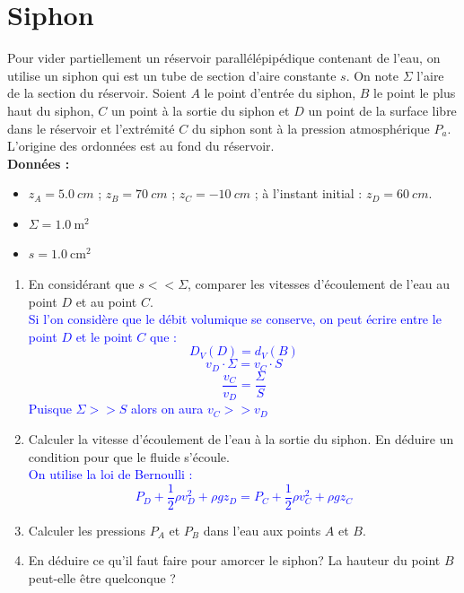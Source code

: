 \documentclass[a4paper,11pt,fleqn,usenames,dvipsnames]{article}%
\begin{document}
\section{Siphon}
Pour vider partiellement un réservoir parallélépipédique contenant de l'eau, on utilise un siphon qui est un tube de section d'aire constante $s$. On note $\Sigma$ l'aire de la section du réservoir. Soient $A$ le point d'entrée du siphon, $B$ le point le plus haut du siphon, $C$ un point à la sortie du siphon et $D$ un point de la surface libre dans le réservoir et l'extrémité $C$ du siphon sont à la pression atmosphérique $P_a$. L'origine des ordonnées est au fond du réservoir.\\
\textbf{Données :}
\begin{itemize}
	\item $z_A=\SI{5,0}{cm}$ ; $z_B=\SI{70}{cm}$ ; $z_C=\SI{-10}{cm}$ ; à l'instant initial : $z_D=\SI{60}{cm}$.
	\item $\Sigma= \SI{1,0}{\meter\squared}$
	\item $s=\SI{1,0}{\centi\meter\squared}$   
\end{itemize}
\begin{enumerate}
	\item En considérant que $s<<\Sigma$, comparer les vitesses d'écoulement de l'eau au point $D$ et au point $C$.\\
	\textcolor{blue}{Si l'on considère que le débit volumique se conserve, on peut écrire entre le point $D$ et le point $C$ que : $$D_V(D)=d_V(B)$$ $$v_D \cdot \Sigma = v_C \cdot S$$
	$$ \dfrac{v_C }{v_D} = \dfrac{\Sigma}{S}$$
	Puisque $\Sigma >>S$ alors on aura $v_C >>v_D$
	}
	\item Calculer la vitesse d'écoulement de l'eau à la sortie du siphon. En déduire un condition pour que le fluide s'écoule.\\
	\textcolor{blue}{On utilise la loi de Bernoulli : 
	$$P_D + \dfrac{1}{2} \rho v_D^2 + \rho g z_D = P_C + \dfrac{1}{2} \rho v_C^2 + \rho g z_C $$
	}
	\item Calculer les pressions $P_A$ et $P_B$ dans l'eau aux points $A$ et $B$.
	\item En déduire ce qu'il faut faire pour amorcer le siphon? La hauteur du point $B$ peut-elle être quelconque ?
\end{enumerate}
\end{document}
